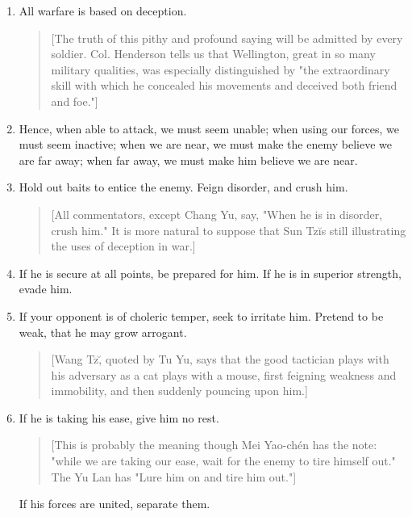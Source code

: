 \documentclass[10pt,a4paper]{book}
\begin{document}
\begin{enumerate}[leftmargin=*, label=\arabic*., resume]
\item All warfare is based on deception.

{\small
\begin{quote}
[The truth of this pithy and profound saying will be admitted by every soldier. Col. Henderson tells us that Wellington, great in so many military qualities, was especially distinguished by "the extraordinary skill with which he concealed his movements and deceived both friend and foe."]
\end{quote}
}

\item Hence, when able to attack, we must seem unable; when using our forces, we must seem inactive; when we are near, we must make the enemy believe we are far away; when far away, we must make him believe we are near.

\item Hold out baits to entice the enemy. Feign disorder, and crush him.

{\small
\begin{quote}
[All commentators, except Chang Yu, say, "When he is in disorder, crush him." It is more natural to suppose that Sun Tz\u is still illustrating the uses of deception in war.]
\end{quote}
}

\item If he is secure at all points, be prepared for him. If he is in superior strength, evade him.

\item If your opponent is of choleric temper, seek to irritate him. Pretend to be weak, that he may grow arrogant.

{\small
\begin{quote}
[Wang Tz\u, quoted by Tu Yu, says that the good tactician plays with his adversary as a cat plays with a mouse, first feigning weakness and immobility, and then suddenly pouncing upon him.]
\end{quote}
}

\item If he is taking his ease, give him no rest.

{\small
\begin{quote}
[This is probably the meaning though Mei Yao-ch\'en has the note: "while we are taking our ease, wait for the enemy to tire himself out." The Yu Lan has "Lure him on and tire him out."]
\end{quote}
}

If his forces are united, separate them.


\end{enumerate}
\end{document}
